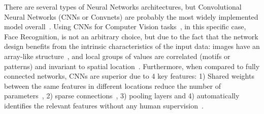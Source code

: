 \documentclass[class=report, crop=false, a4paper, 12pt]{standalone}
\begin{document}
\par There are several types of Neural Networks architectures, but Convolutional Neural Networks (CNNs or Convnets) are probably the most widely implemented model overall~\autocite{yamashitaConvolutionalNeuralNetworks2018, liSurveyConvolutionalNeural2022}. Using CNNs for Computer Vision tasks~\autocite{krizhevskyImageNetClassificationDeep2012,taigmanDeepFaceClosingGap2014,tompsonEfficientObjectLocalization2015, zhangImprovedBreastCancer2021}, in this specific case, Face Recognition, is not an arbitrary choice, but due to the fact that the network design benefits from the intrinsic characteristics of the input data: images have an array-like structure~\autocite{yamashitaConvolutionalNeuralNetworks2018}, and local groups of values are correlated (motifs or patterns) and invariant to spatial location~\autocite{lecunDeepLearning2015,caoReviewNeuralNetworks2018}. Furthermore, when compared to fully connected networks, CNNs are superior due to 4 key features: 1) Shared weights between the same features in different locations reduce the number of parameters~\autocite{liSurveyConvolutionalNeural2022}, 2) sparse connections~\autocite{alzubaidiReviewDeepLearning2021}, 3) pooling layers and 4) automatically identifies the relevant features without any human supervision~\autocite{alzubaidiReviewDeepLearning2021,liSurveyConvolutionalNeural2022}.
\end{document}
